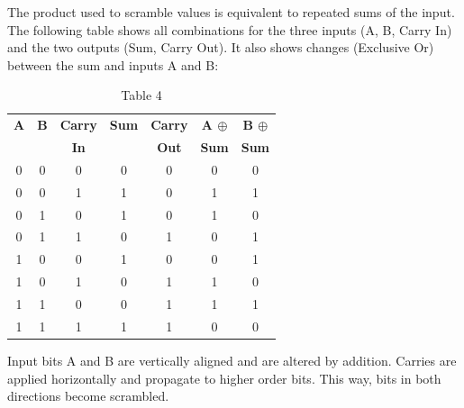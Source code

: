 \documentclass[preprint]{sigplanconf}
\begin{document}
The product used to scramble values is equivalent to repeated sums of the input. The following table shows all combinations for the three inputs (A, B, Carry In) and the two outputs (Sum, Carry Out). It also shows changes (Exclusive Or) between the sum and inputs A and B:

\begin{table}
    \begin{center}
        \begin{tabular}{|c c c|c c|c c|}
            \hline
            \textbf{A} & \textbf{B} & \textbf{Carry} & \textbf{Sum} & \textbf{Carry} & \textbf{A $\oplus$} & \textbf{B $\oplus$} \\
                       &            & \textbf{In}    &              & \textbf{Out}   & \textbf{Sum}        & \textbf{Sum}        \\
            \hline
            0          & 0          & 0              & 0            & 0              & 0                   & 0                   \\
            0          & 0          & 1              & 1            & 0              & 1                   & 1                   \\
            0          & 1          & 0              & 1            & 0              & 1                   & 0                   \\
            0          & 1          & 1              & 0            & 1              & 0                   & 1                   \\
            1          & 0          & 0              & 1            & 0              & 0                   & 1                   \\
            1          & 0          & 1              & 0            & 1              & 1                   & 0                   \\
            1          & 1          & 0              & 0            & 1              & 1                   & 1                   \\
            1          & 1          & 1              & 1            & 1              & 0                   & 0                   \\
            \hline
        \end{tabular}
        \caption{Table 4}
        \label{tab-4}
    \end{center}
\end{table}

Input bits A and B are vertically aligned and are altered by addition. Carries are applied horizontally and propagate to higher order bits. This way, bits in both directions become scrambled.
\end{document}
